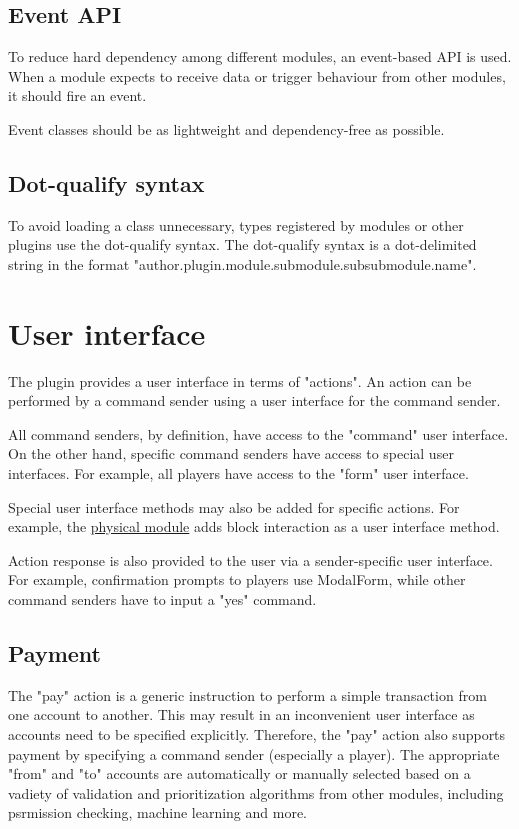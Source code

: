 \documentclass{report}
\begin{document}
			\subsection{Event API}

				To reduce hard dependency among different modules, an event-based API is used.
				When a module expects to receive data or trigger behaviour from other modules,
				it should fire an event.

				Event classes should be as lightweight and dependency-free as possible.

			\subsection{Dot-qualify syntax}
				To avoid loading a class unnecessary, types registered by modules or other plugins use the dot-qualify syntax.
				The dot-qualify syntax is a dot-delimited string in the format "author.plugin.module.submodule.subsubmodule.name".

		\section{User interface}

			The plugin provides a user interface in terms of "actions".
			An action can be performed by a command sender using a user interface for the command sender.

			All command senders, by definition, have access to the "command" user interface.
			On the other hand, specific command senders have access to special user interfaces.
			For example, all players have access to the "form" user interface.

			Special user interface methods may also be added for specific actions.
			For example, the \href{sec:physical-module}{physical module} adds block interaction as a user interface method.

			Action response is also provided to the user via a sender-specific user interface.
			For example, confirmation prompts to players use ModalForm,
			while other command senders have to input a "yes" command.

			\subsection{Payment}

				The "pay" action is a generic instruction to perform a simple transaction from one account to another.
				This may result in an inconvenient user interface as accounts need to be specified explicitly.
				Therefore, the "pay" action also supports payment by specifying a command sender (especially a player).
				The appropriate "from" and "to" accounts are automatically or manually selected
				based on a vadiety of validation and prioritization algorithms from other modules,
				including psrmission checking, machine learning and more.
\end{document}
